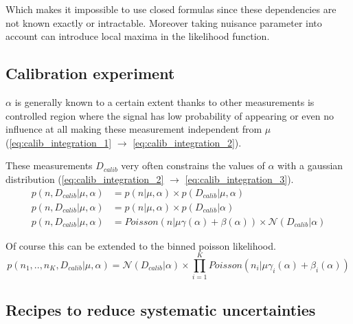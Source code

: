 Which makes it impossible to use closed formulas since these dependencies are not known exactly or intractable.
Moreover taking nuisance parameter into account can introduce local maxima in the likelihood function.








\subsection{Calibration experiment} %
\label{sub:calibration_experiment}

$\alpha$ is generally known to a certain extent thanks to other measurements is controlled region where the signal has low probability of appearing or even no influence at all making these measurement independent from $\mu$ (\autoref{eq:calib_integration_1} $\to$ \autoref{eq:calib_integration_2}).

These measurements $D_{calib}$ very often constrains the values of $\alpha$ with a gaussian distribution (\autoref{eq:calib_integration_2} $\to$ \autoref{eq:calib_integration_3}).
\begin{align}
	\label{eq:calib_integration_1}
	p(n, D_{calib} | \mu, \alpha) &= p(n | \mu, \alpha) \times p(D_{calib} | \mu, \alpha) \\
	\label{eq:calib_integration_2}
	p(n, D_{calib} | \mu, \alpha) &= p(n | \mu, \alpha) \times p(D_{calib} | \alpha) \\
	\label{eq:calib_integration_3}
	p(n, D_{calib} | \mu, \alpha) &= Poisson(n | \mu \gamma(\alpha) +\beta(\alpha)) \times \mathcal N(D_{calib} | \alpha)
\end{align}

Of course this can be extended to the binned poisson likelihood.
\begin{equation}
	p(n_1, .., n_K, D_{calib} | \mu, \alpha) = \mathcal N(D_{calib} | \alpha) \times \prod_{i=1}^K Poisson(n_i | \mu \gamma_i(\alpha) +\beta_i(\alpha))
\end{equation}







\subsection{Recipes to reduce systematic uncertainties} %
\label{sub:recipes_to_reduce_systematic_unceratinties}

